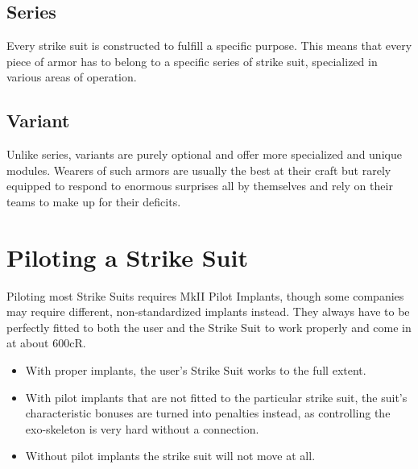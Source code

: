 \documentclass[12pt,a4paper,openany]{book}
\begin{document}
	\section{Series}
	Every strike suit is constructed to fulfill a specific purpose. This means that every piece of armor has to belong to a specific series of strike suit, specialized in various areas of operation.

    \begin{multicols}{2}
    \end{multicols}
    
    \section{Variant}
    Unlike series, variants are purely optional and offer more specialized and unique modules. Wearers of such armors are usually the best at their craft but rarely equipped to respond to enormous surprises all by themselves and rely on their teams to make up for their deficits.
    
    \begin{multicols}{2}
    \end{multicols}
    
    \chapter{Piloting a Strike Suit}
    Piloting most Strike Suits requires MkII Pilot Implants, though some companies may require different, non-standardized implants instead. They always have to be perfectly fitted to both the user and the Strike Suit to work properly and come in at about 600cR.\\
    \begin{itemize}
    	\item With proper implants, the user's Strike Suit works to the full extent.
    	\item With pilot implants that are not fitted to the particular strike suit, the suit's characteristic bonuses are turned into penalties instead, as controlling the exo-skeleton is very hard without a connection.
    	\item Without pilot implants the strike suit will not move at all.
    \end{itemize}
    
\end{document}
